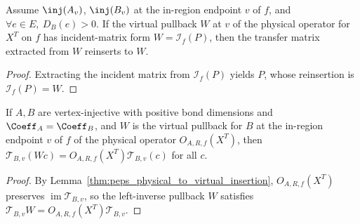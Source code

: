 \begin{lemma}
    \label{thm:peps_hform_of_region_incident_form}
    \leanok
    Assume $\inj(A_v)$, $\inj(B_v)$ at the in-region endpoint $v$ of $f$, and
    $\forall e\in E,\ D_B(e)>0$. If the virtual pullback $W$ at $v$ of the
    physical operator for $X^T$ on $f$ has incident-matrix form
    $W=\mathcal I_f(P)$, then the transfer matrix extracted from $W$ reinserts
    to $W$.
\end{lemma}
\begin{proof}\leanok
    Extracting the incident matrix from $\mathcal I_f(P)$ yields $P$, whose
    reinsertion is $\mathcal I_f(P)=W$.
\end{proof}

\begin{lemma}
    \label{thm:peps_region_insertion_virtual_pullback_realizes}
    \leanok
    If $A,B$ are vertex-injective with positive bond dimensions and
    $\Coeff_A=\Coeff_B$, and $W$ is the virtual pullback for $B$ at the
    in-region endpoint $v$ of $f$ of the physical operator $O_{A,R,f}(X^T)$,
    then $\mathcal T_{B,v}(Wc)=O_{A,R,f}(X^T)\mathcal T_{B,v}(c)$ for all $c$.
\end{lemma}
\begin{proof}\leanok
    By Lemma~\ref{thm:peps_physical_to_virtual_insertion}, $O_{A,R,f}(X^T)$
    preserves $\operatorname{im}\mathcal T_{B,v}$, so the left-inverse pullback
    $W$ satisfies $\mathcal T_{B,v}W=O_{A,R,f}(X^T)\mathcal T_{B,v}$.
\end{proof}

